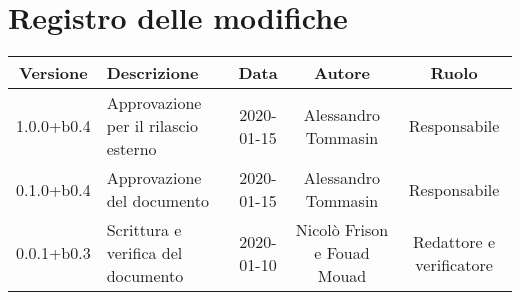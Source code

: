 \section*{Registro delle modifiche}

\begin{center}
	\begin{longtable}{|c|p{3cm}|c|c|c|}
	\hline
	\rowcolor{lighter-grayer}
	\textbf{Versione} & \textbf{Descrizione} & \textbf{Data} & \textbf{Autore} & \textbf{Ruolo} \\
	\hline
	\endfirsthead



	1.0.0+b0.4 & Approvazione per il rilascio esterno & 2020-01-15 & Alessandro Tommasin & Responsabile \\
	\hline
	0.1.0+b0.4 & Approvazione del documento & 2020-01-15 & Alessandro Tommasin & Responsabile \\
	\hline
	0.0.1+b0.3 & Scrittura e verifica del documento & 2020-01-10 & Nicolò Frison e Fouad Mouad & Redattore e verificatore \\
	\hline
	\end{longtable}
\end{center}
